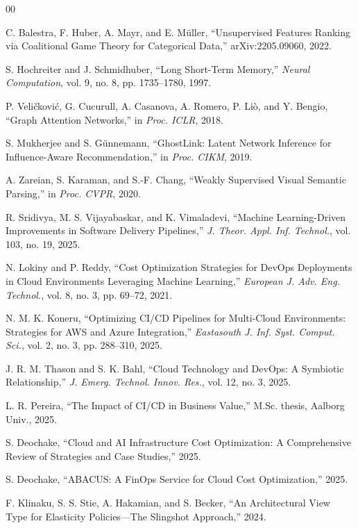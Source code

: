 \documentclass[journal]{IEEEtran}
\begin{document}
\begin{thebibliography}{00}

C. Balestra, F. Huber, A. Mayr, and E. M\"uller, ``Unsupervised Features Ranking via Coalitional Game Theory for Categorical Data,'' arXiv:2205.09060, 2022.

S. Hochreiter and J. Schmidhuber, ``Long Short-Term Memory,'' \emph{Neural Computation}, vol. 9, no. 8, pp. 1735--1780, 1997.

P. Veli\v{c}kovi\'c, G. Cucurull, A. Casanova, A. Romero, P. Li\`o, and Y. Bengio, ``Graph Attention Networks,'' in \emph{Proc. ICLR}, 2018.

S. Mukherjee and S. G\"unnemann, ``GhostLink: Latent Network Inference for Influence-Aware Recommendation,'' in \emph{Proc. CIKM}, 2019.

A. Zareian, S. Karaman, and S.-F. Chang, ``Weakly Supervised Visual Semantic Parsing,'' in \emph{Proc. CVPR}, 2020.

R. Sridivya, M. S. Vijayabaskar, and K. Vimaladevi, ``Machine Learning-Driven Improvements in Software Delivery Pipelines,'' \emph{J. Theor. Appl. Inf. Technol.}, vol. 103, no. 19, 2025.

N. Lokiny and P. Reddy, ``Cost Optimization Strategies for DevOps Deployments in Cloud Environments Leveraging Machine Learning,'' \emph{European J. Adv. Eng. Technol.}, vol. 8, no. 3, pp. 69--72, 2021.

N. M. K. Koneru, ``Optimizing CI/CD Pipelines for Multi-Cloud Environments: Strategies for AWS and Azure Integration,'' \emph{Eastasouth J. Inf. Syst. Comput. Sci.}, vol. 2, no. 3, pp. 288--310, 2025.

J. R. M. Thason and S. K. Bahl, ``Cloud Technology and DevOps: A Symbiotic Relationship,'' \emph{J. Emerg. Technol. Innov. Res.}, vol. 12, no. 3, 2025.

L. R. Pereira, ``The Impact of CI/CD in Business Value,'' M.Sc. thesis, Aalborg Univ., 2025.

S. Deochake, ``Cloud and AI Infrastructure Cost Optimization: A Comprehensive Review of Strategies and Case Studies,'' 2025.

S. Deochake, ``ABACUS: A FinOps Service for Cloud Cost Optimization,'' 2025.

F. Klinaku, S. S. Stie, A. Hakamian, and S. Becker, ``An Architectural View Type for Elasticity Policies---The Slingshot Approach,'' 2024.


\end{thebibliography}
\end{document}
